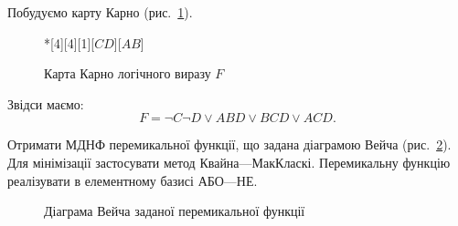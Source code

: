 \documentclass[a4paper,oneside,DIV=12,12pt]{scrartcl}
\newcommand{\nbspthin}{\kern 1pt}
\begin{document}
\begin{solution}
		Побудуємо карту Карно (рис.~\ref{fig:task3-karnaugh-map}).
		\begin{figure}
		\centering
			\begin{karnaugh-map}*[4][4][1][$CD$][$AB$]
			\end{karnaugh-map}
		\caption{Карта Карно логічного виразу $F$}
		\label{fig:task3-karnaugh-map}
		\end{figure}
		Звідси маємо:
		\[
			F = \neg{C} \neg{D} \lor ABD \lor BCD \lor ACD.
		\]
	\end{solution}
	
	\begin{exercise}
		Отримати МДНФ перемикальної функції, що задана діаграмою Вейча (рис.~\ref{fig:task4-veitch-diagram}). Для мінімізації застосувати метод Квайна\nbspthin —\nbspthin МакКласкі. Перемикальну функцію реалізувати в елементному базисі АБО---НЕ.
		
		\begin{figure}[!htbp]
		\centering
		\caption{Діаграма Вейча заданої перемикальної функції}
		\label{fig:task4-veitch-diagram}
		\end{figure}
		
	\end{exercise}
	
\end{document}

